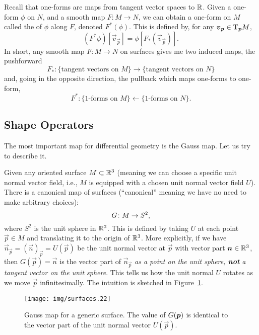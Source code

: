 \M
Recall that one-forms are maps from tangent vector spaces to
$\mathbb{R}$. Given a one-form $\phi$ on $N$, and a smooth map $F\colon M\to N$,
we can obtain a one-form on $M$ called the  of $\phi$
along $F$, denoted $F^{*}(\phi)$. This is defined by, for any $\boldsymbol{v}_{\boldsymbol{p}}\in\mathrm{T}_{\boldsymbol{p}}M$,
\begin{equation}
(F^{*}\phi)[\vec{v}_{\vec{p}}] = \phi[F_{*}(\vec{v}_{\vec{p}})].
\end{equation}
In short, any smooth map $F\colon M\to N$ on surfaces gives me two
induced maps, the pushforward
\begin{equation*}
F_{*}\colon\{\mbox{tangent vectors on $M$}\}\to\{\mbox{tangent vectors on $N$}\}
\end{equation*}
and, going in the opposite direction, the pullback which maps one-forms
to one-form,
\begin{equation*}
F^{*}\colon\{\mbox{1-forms on $M$}\}\gets\{\mbox{1-forms on $N$}\}.
\end{equation*}

\subsection{Shape Operators}

The most important map for differential geometry is the Gauss map. Let
us try to describe it.

Given any oriented surface $M\subset\mathbb{R}^{3}$ (meaning we can choose a
specific unit normal vector field, i.e., $M$ is equipped with a chosen
unit normal vector field $U$). There is a canonical map of surfaces
(``canonical'' meaning we have no need to make arbitrary choices):
\begin{equation}
G\colon M\to S^{2},
\end{equation}
where $S^{2}$ is the unit sphere in $\mathbb{R}^{3}$. This is defined by taking
$U$ at each point $\vec{p}\in M$ and translating it to the origin of
$\mathbb{R}^{3}$. More explicitly, if we have
$\vec{n}_{\vec{p}}=(\vec{n})_{\vec{p}}=U(\vec{p})$ be the unit normal
vector at $\vec{p}$ with vector part $\boldsymbol{n}\in\mathbb{R}^{3}$, then
$G(\vec{p})=\vec{n}$ is the vector part of $\vec{n}_{\vec{p}}$ \emph{as
a point on the unit sphere, \textbf{not} a tangent vector on the unit sphere}.
This tells us how the unit normal $U$ rotates as we move
$\vec{p}$ infinitesimally. The intuition is sketched in Figure~\ref{fig:gauss-map-intuition}.
\begin{figure}[t]
\centering
  \texttt{[image: img/surfaces.22]}
\caption{Gauss map for a generic surface. The value of
  $G(\boldsymbol{p})$ is identical to the vector part of the unit normal vector $U(\vec{p})$.}\label{fig:gauss-map-intuition}
\end{figure}


